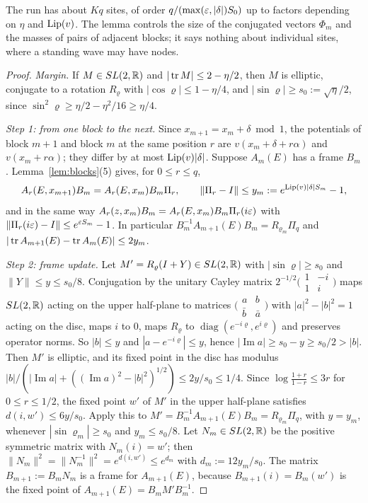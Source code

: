 The run has about $Kq$ sites, of order $q/(\max(\varepsilon,|\delta|)S_0)$ up to factors depending on $\eta$ and $\operatorname{Lip}(v)$. The lemma controls the size of the conjugated vectors $\Phi_m$ and the masses of pairs of adjacent blocks; it says nothing about individual sites, where a standing wave may have nodes.

\begin{proof}
\emph{Margin.} If $M\in SL(2,\mathbb R)$ and $|\operatorname{tr} M|\le2-\eta/2$, then $M$ is elliptic, conjugate to a rotation $R_\varrho$ with $|\cos\varrho|\le1-\eta/4$, and $|\sin\varrho|\ge s_0:=\sqrt\eta/2$, since $\sin^2\varrho\ge\eta/2-\eta^2/16\ge\eta/4$.

\emph{Step 1: from one block to the next.} Since $x_{m+1}=x_m+\delta\bmod 1$, the potentials of block $m+1$ and block $m$ at the same position $r$ are $v(x_m+\delta+r\alpha)$ and $v(x_m+r\alpha)$; they differ by at most $\operatorname{Lip}(v)|\delta|$. Suppose $A_m(E)$ has a frame $B_m$. Lemma~\ref{lem:blocks}(5) gives, for $0\le r\le q$,
\[
A_r(E,x_{m+1})B_m=A_r(E,x_m)B_m\Pi_r,\qquad\|\Pi_r-I\|\le y_m:=e^{\operatorname{Lip}(v)|\delta|S_m}-1,
\]
and in the same way $A_r(z,x_m)B_m=A_r(E,x_m)B_m\Pi_r(i\varepsilon)$ with $\|\Pi_r(i\varepsilon)-I\|\le e^{\varepsilon S_m}-1$. In particular $B_m^{-1}A_{m+1}(E)B_m=R_{\varrho_m}\Pi_q$ and $|\operatorname{tr} A_{m+1}(E)-\operatorname{tr} A_m(E)|\le2y_m$.

\emph{Step 2: frame update.} Let $M'=R_\varrho(I+Y)\in SL(2,\mathbb R)$ with $|\sin\varrho|\ge s_0$ and $\|Y\|\le y\le s_0/8$. Conjugation by the unitary Cayley matrix $2^{-1/2}\bigl(\begin{smallmatrix}1&-i\\1&i\end{smallmatrix}\bigr)$ maps $SL(2,\mathbb R)$ acting on the upper half-plane to matrices $\bigl(\begin{smallmatrix}a&b\\\bar b&\bar a\end{smallmatrix}\bigr)$ with $|a|^2-|b|^2=1$ acting on the disc, maps $i$ to $0$, maps $R_\varrho$ to $\operatorname{diag}(e^{-i\varrho},e^{i\varrho})$ and preserves operator norms. So $|b|\le y$ and $|a-e^{-i\varrho}|\le y$, hence $|\operatorname{Im}a|\ge s_0-y\ge s_0/2>|b|$. Then $M'$ is elliptic, and its fixed point in the disc has modulus $|b|/(|\operatorname{Im}a|+((\operatorname{Im}a)^2-|b|^2)^{1/2})\le2y/s_0\le1/4$. Since $\log\frac{1+r}{1-r}\le3r$ for $0\le r\le1/2$, the fixed point $w'$ of $M'$ in the upper half-plane satisfies $d(i,w')\le6y/s_0$. Apply this to $M'=B_m^{-1}A_{m+1}(E)B_m=R_{\varrho_m}\Pi_q$, with $y=y_m$, whenever $|\sin\varrho_m|\ge s_0$ and $y_m\le s_0/8$. Let $N_m\in SL(2,\mathbb R)$ be the positive symmetric matrix with $N_m(i)=w'$; then $\|N_m\|^2=\|N_m^{-1}\|^2=e^{d(i,w')}\le e^{d_m}$ with $d_m:=12y_m/s_0$. The matrix $B_{m+1}:=B_mN_m$ is a frame for $A_{m+1}(E)$, because $B_{m+1}(i)=B_m(w')$ is the fixed point of $A_{m+1}(E)=B_mM'B_m^{-1}$.


\end{proof}

